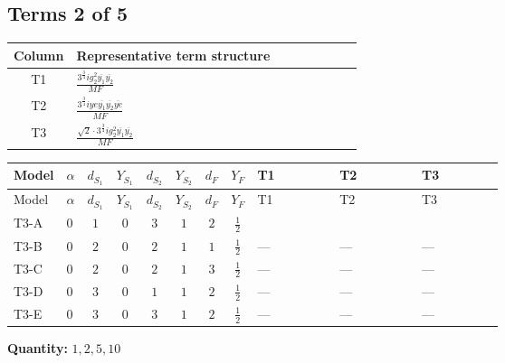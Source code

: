 \documentclass[8pt]{article}
\begin{document}
\begin{landscape}
\subsection*{Terms 2 of 5}
\begin{center}
\begin{tabular}{@{}c >{\raggedright\arraybackslash}p{0.82\linewidth}@{}}
\toprule
Column & Representative term structure \\
\midrule
T1 & \(\displaystyle \frac{3^{\frac{3}{4}} i g_{2}^{2} \overline{y_{1}} \overline{y_{2}}}{MF}\) \\
\midrule
T2 & \(\displaystyle \frac{3^{\frac{3}{4}} i ye \overline{y_{1}} \overline{y_{2}} \overline{ye}}{MF}\) \\
\midrule
T3 & \(\displaystyle \frac{\sqrt{2} \cdot 3^{\frac{3}{4}} i g_{2}^{2} \overline{y_{1}} \overline{y_{2}}}{MF}\) \\
\midrule
\bottomrule
\end{tabular}
\end{center}
\smallskip
\tiny
\begin{longtable}{@{}llcccccc >{\raggedright\arraybackslash}p{0.21\linewidth} >{\raggedright\arraybackslash}p{0.21\linewidth} >{\raggedright\arraybackslash}p{0.21\linewidth}@{}}
\toprule
Model & $\alpha$ & $d_{S_1}$ & $Y_{S_1}$ & $d_{S_2}$ & $Y_{S_2}$ & $d_F$ & $Y_F$ & T1 & T2 & T3 \\
\midrule
\endfirsthead
\toprule
Model & $\alpha$ & $d_{S_1}$ & $Y_{S_1}$ & $d_{S_2}$ & $Y_{S_2}$ & $d_F$ & $Y_F$ & T1 & T2 & T3 \\
\midrule
\endhead
T3-A & $0$ & $1$ & $0$ & $3$ & $1$ & $2$ & $\frac{1}{2}$ & \scriptsize\adjustbox{max width=\linewidth}{$\begin{gathered} \frac{25 \cdot 3^{\frac{3}{4}} i g_{2}^{2} \overline{y_{1}} \overline{y_{2}}}{24 MF}\end{gathered}$} & \scriptsize\adjustbox{max width=\linewidth}{$\begin{gathered} - \frac{3^{\frac{3}{4}} i ye \overline{y_{1}} \overline{y_{2}} \overline{ye}}{12 MF}\end{gathered}$} & \scriptsize\adjustbox{max width=\linewidth}{$\begin{gathered} \frac{\sqrt{2} \cdot 3^{\frac{3}{4}} i g_{2}^{2} \overline{y_{1}} \overline{y_{2}}}{6 MF}\end{gathered}$} \\
\midrule
T3-B & $0$ & $2$ & $0$ & $2$ & $1$ & $1$ & $\frac{1}{2}$ & --- & --- & --- \\
\midrule
T3-C & $0$ & $2$ & $0$ & $2$ & $1$ & $3$ & $\frac{1}{2}$ & --- & --- & --- \\
\midrule
T3-D & $0$ & $3$ & $0$ & $1$ & $1$ & $2$ & $\frac{1}{2}$ & --- & --- & --- \\
\midrule
T3-E & $0$ & $3$ & $0$ & $3$ & $1$ & $2$ & $\frac{1}{2}$ & --- & --- & --- \\
\midrule
\bottomrule
\end{longtable}
\clearpage
\noindent\textbf{Quantity: }$\mathrm{1,2,5,10}$\par\smallskip

\end{landscape}
\end{document}
